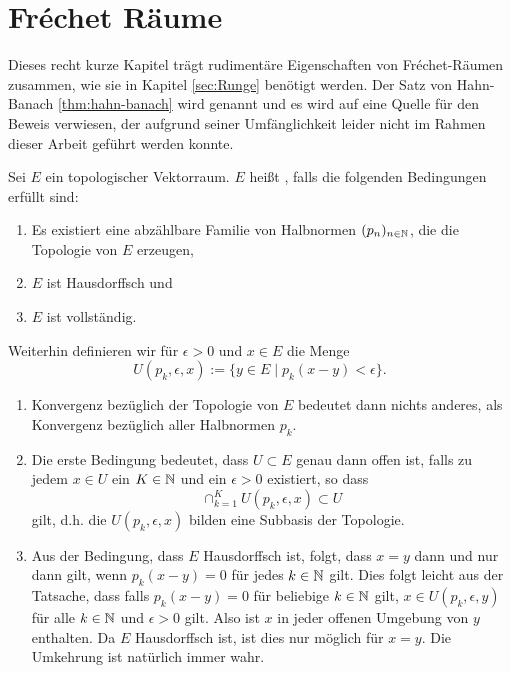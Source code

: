 
\section{Fr\'echet Räume}
\label{sec:frechet}

Dieses recht kurze Kapitel trägt rudimentäre Eigenschaften von
Fr\'echet-Räumen zusammen, wie sie in Kapitel \ref{sec:Runge} benötigt
werden. Der Satz von Hahn-Banach \ref{thm:hahn-banach} wird genannt
und es wird auf eine Quelle für den Beweis verwiesen, der aufgrund
seiner Umfänglichkeit leider nicht im Rahmen dieser Arbeit geführt
werden konnte.

\begin{defin}
  \label{def:frechet}
  Sei $E$ ein topologischer Vektorraum. $E$ heißt
  , falls die folgenden Bedingungen erfüllt sind:
  \begin{enumerate}
  \item Es existiert eine abzählbare Familie von Halbnormen $(p_n)_{n
      \in \mathbb{N}}$, die die Topologie von $E$ erzeugen,
  \item $E$ ist Hausdorffsch und
  \item $E$ ist vollständig.
  \end{enumerate}
  Weiterhin definieren wir für $\epsilon > 0$ und $x \in E$ die Menge
  \[
  U(p_k, \epsilon, x) := \{ y \in E \mid p_k(x-y) < \epsilon\}.
  \]
\end{defin}


\begin{rem}
  \label{rem:frechet}
  \begin{enumerate}
  \item Konvergenz bezüglich der Topologie von $E$ bedeutet dann
    nichts anderes, als Konvergenz bezüglich aller Halbnormen $p_k$.
  \item Die erste Bedingung bedeutet, dass $U\subset E$ genau dann
    offen ist, falls zu jedem $x \in U$ ein $K \in \mathbb{N}$ und ein
    $\epsilon > 0$ existiert, so dass
    \[
    \cap_{k=1}^K U(p_k, \epsilon, x) \subset U
    \]
    gilt, d.h. die $U(p_k, \epsilon, x)$ bilden eine Subbasis der Topologie.
  \item Aus der Bedingung, dass $E$ Hausdorffsch ist, folgt, dass $x =
    y$ dann und nur dann gilt, wenn $p_k(x-y) = 0$ für jedes $k \in
    \mathbb{N}$ gilt. Dies folgt leicht aus der Tatsache, dass falls $p_k(x-y)
    = 0$ für beliebige $k \in \mathbb{N}$ gilt, $x \in U(p_k, \epsilon, y)$ für
    alle $k \in \mathbb{N}$ und $\epsilon > 0$ gilt. Also ist $x$ in jeder
    offenen Umgebung von $y$ enthalten. Da $E$ Hausdorffsch ist, ist
    dies nur möglich für $x = y$. Die Umkehrung ist natürlich immer wahr.
  \end{enumerate}
\end{rem}

